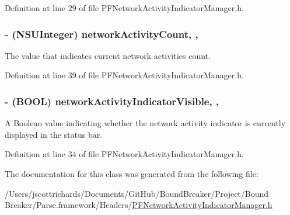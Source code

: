 Definition at line 29 of file P\+F\+Network\+Activity\+Indicator\+Manager.\+h.

\hypertarget{interface_p_f_network_activity_indicator_manager_ab52923fab090824b0bb2609b91b1e39b}{}
\subsubsection[{network\+Activity\+Count}]{\setlength{\rightskip}{0pt plus 5cm}-\/ (N\+S\+U\+Integer) network\+Activity\+Count\hspace{0.3cm}{\ttfamily [read]}, {\ttfamily [nonatomic]}, {\ttfamily [assign]}}\label{interface_p_f_network_activity_indicator_manager_ab52923fab090824b0bb2609b91b1e39b}
The value that indicates current network activities count. 

Definition at line 39 of file P\+F\+Network\+Activity\+Indicator\+Manager.\+h.

\hypertarget{interface_p_f_network_activity_indicator_manager_a1e3d2adc9c714d59c15b63df0f9e8c9a}{}
\subsubsection[{network\+Activity\+Indicator\+Visible}]{\setlength{\rightskip}{0pt plus 5cm}-\/ (B\+O\+O\+L) network\+Activity\+Indicator\+Visible\hspace{0.3cm}{\ttfamily [read]}, {\ttfamily [nonatomic]}, {\ttfamily [assign]}}\label{interface_p_f_network_activity_indicator_manager_a1e3d2adc9c714d59c15b63df0f9e8c9a}
A Boolean value indicating whether the network activity indicator is currently displayed in the status bar. 

Definition at line 34 of file P\+F\+Network\+Activity\+Indicator\+Manager.\+h.



The documentation for this class was generated from the following file\+:\begin{DoxyCompactItemize}
\item 
/\+Users/jscottrichards/\+Documents/\+Git\+Hub/\+Bound\+Breaker/\+Project/\+Bound Breaker/\+Parse.\+framework/\+Headers/\hyperlink{_p_f_network_activity_indicator_manager_8h}{P\+F\+Network\+Activity\+Indicator\+Manager.\+h}\end{DoxyCompactItemize}

